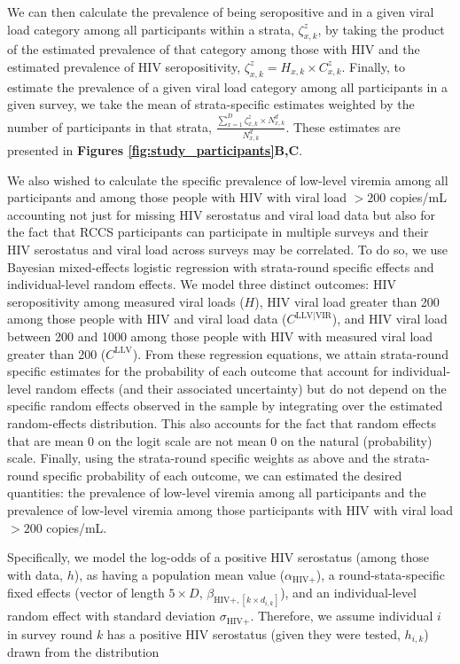 \documentclass{article}[11pt]
\begin{document}
We can then calculate the prevalence of being seropositive and in a given viral load category among all participants within a strata, $\zeta^z_{x,k}$, by taking the product of the estimated prevalence of that category among those with HIV and the estimated prevalence of HIV seropositivity, $\zeta^z_{x,k} = H_{x,k}\times C^z_{x,k}$. Finally, to estimate the prevalence of a given viral load category among all participants in a given survey, we take the mean of strata-specific estimates weighted by the number of participants in that strata, $\frac{\sum_{x=1}^D \zeta^z_{x,k}\times N^d_{x,k} }{N^d_{x,k} }$. These estimates are presented in \textbf{Figures \ref{fig:study_participants}B,C}. 

We also wished to calculate the specific prevalence of low-level viremia among all participants and among those people with HIV with viral load $>200$ copies/mL accounting not just for missing HIV serostatus and viral load data but also for the fact that RCCS participants can participate in multiple surveys and their HIV serostatus and viral load across surveys may be correlated. To do so, we use Bayesian mixed-effects logistic regression with strata-round specific effects and individual-level random effects. We model three distinct outcomes: HIV seropositivity among measured viral loads ($H$), HIV viral load greater than 200 among those people with HIV and viral load data ($C^{\text{LLV}|\text{VIR}}$), and HIV viral load between 200 and 1000 among those people with HIV with measured viral load greater than 200 ($C^\text{LLV}$). From these regression equations, we attain strata-round specific estimates for the probability of each outcome that account for individual-level random effects (and their associated uncertainty) but do not depend on the specific random effects observed in the sample by integrating over the estimated random-effects distribution. This also accounts for the fact that random effects that are mean 0 on the logit scale are not mean 0 on the natural (probability) scale. Finally, using the strata-round specific weights as above and the strata-round specific probability of each outcome, we can estimated the desired quantities: the prevalence of low-level viremia among all participants and the prevalence of low-level viremia among those participants with HIV with viral load $>200$ copies/mL. 

Specifically, we model the log-odds of a positive HIV serostatus (among those with data, $h$), as having a population mean value ($\alpha_{\text{HIV+}}$), a round-stata-specific fixed effects (vector of length $5 \times D$, $\beta_{\text{HIV+},[k \times d_{i,k}]}$), and an individual-level random effect with standard deviation $\sigma_{\text{HIV+}}$. Therefore, we assume individual $i$ in survey round $k$ has a positive HIV serostatus (given they were tested, $h_{i,k}$) drawn from the distribution
\end{document}
